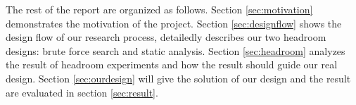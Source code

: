  The rest of the report are organized as follows. Section \ref{sec:motivation} demonstrates the motivation of the project. Section \ref{sec:designflow} shows the design flow of our research process, detailedly describes our two headroom designs: brute force search and static analysis. Section \ref{sec:headroom} analyzes the result of headroom experiments and how the result should guide our real design. Section \ref{sec:ourdesign} will give the solution of our design and the result are evaluated in section \ref{sec:result}.
 
 
 
